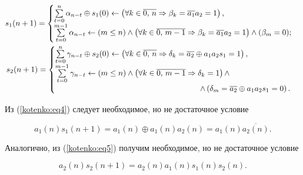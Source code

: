 \begin{gather*}

s_1 (n+1)=\begin{cases}

\sum \limits_{t=0}^n \alpha_{n-t} \oplus s_1 ( 0 ) \leftarrow

\left( \forall k\in \overline {0,\,n} \Rightarrow \beta_k =\overline {a_1}

a_2 =1 \right), \\

\sum\limits_{t=0}^{m-1} \alpha _{n-t}  \leftarrow ( m\le n )\wedge \left( \forall k\in \overline {0,\,m-1} \Rightarrow \beta_k

=\overline {a_1} a_2 =1 \right)\wedge (\beta _m =0);

\end{cases} \\

s_2 ( n+1 )=\begin{cases}

\sum\limits_{t=0}^n \gamma _{n-t}  \oplus s_2 ( 0 )\leftarrow

\left( \forall k\in \overline {0,\,n} \Rightarrow \delta _k =\overline {a_2}

\oplus a_1 a_2 s_1 =1 \right), \\

\sum\limits_{t=0}^{m-1} \gamma _{n-t} \leftarrow ( m\le n )\wedge \left( \forall k\in \overline {0,\,m-1} \Rightarrow \delta _k

=1\right)\wedge \\ \hspace{6.5cm}  \wedge\left( \delta _m =\overline {a_2} \oplus a_1 a_2 s_1 =0\right).

\end{cases}

\end{gather*}

Из (\ref{kotenko:eq4}) следует необходимое, но не достаточное условие

\[

a_1 ( n )s_1 ( n+1)=a_1 ( n )\oplus a_1

( n )a_2 ( n )=a_1 ( n )\overline {a_2

( n )}.

\]



Аналогично, из (\ref{kotenko:eq5}) получим необходимое, но не достаточное условие

\[

a_2 ( n )s_2 (n+1)=a_2 ( n )a_1 (n)s_1 ( n )s_2 ( n ).

\]



